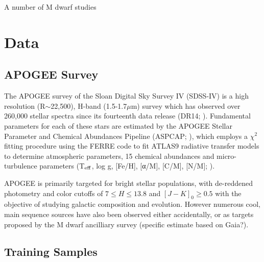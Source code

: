 \documentclass[modern]{aastex62}
\begin{document}
A number of M dwarf studies


\section{Data} \label{sec:data}

\subsection{APOGEE Survey}


The APOGEE survey \citep{Majewski:2015} of the Sloan Digital Sky Survey IV (SDSS-IV) is a high resolution (R$\sim$22,500), H-band (1.5-1.7$\mu$m) survey which has observed over 260,000 stellar spectra since its fourteenth data release (DR14; \citealt{Abolfathi:2017}). Fundamental parameters for each of these stars are estimated by the APOGEE Stellar Parameter and Chemical Abundances Pipeline (ASPCAP; \citealt{Perez:2016}), which employs a $\chi^2$ fitting procedure using the FERRE code to fit ATLAS9 radiative transfer models \citep{Castelli:2004} to determine atmospheric parameters, 15 chemical abundances and micro-turbulence parameters (T$_{\rm eff}$, log g, [Fe/H], [α/M], [C/M], [N/M]; \citealt{Meszaros:2012}). 

APOGEE is primarily targeted for bright stellar populations, with de-reddened photometry and color cutoffs of $7 \leq H \leq 13.8$ and $[J-K]_0 \geq 0.5$ \citep{Zasowski:2013} with the objective of studying galactic composition and evolution. However numerous cool, main sequence sources have also been observed either accidentally, or as targets proposed by the M dwarf ancilliary survey \citep{Desphande:2013} (specific estimate based on Gaia?).


\subsection{Training Samples}
\end{document}
